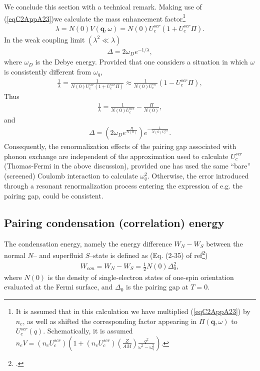 We conclude this section with a technical remark. Making use of (\ref{eqC2AppA23})we calculate the mass enhancement factor\footnote{It is assumed that in this calculation we have multiplied (\ref{eqC2AppA23}) by $n_e$, as well as shifted the corresponding factor appearing in $\Pi(\mathbf q, \omega)$ to $U_c^{scr}(q)$. Schematically, it is assumed $n_eV=(n_e U_c^{scr})\left(1+(n_e U_c^{scr})\left(\frac{Z}{AM}\right)\frac{q^2}{\omega^2-\omega_q^2}\right)$.}
\begin{align}\label{eqC2AppA25}
\lambda=N(0)V(\mathbf q,\omega)=N(0)U^{scr}_c\left(1+U^{scr}_c\Pi\right).
\end{align}
In the weak coupling limit $(\lambda^2\ll\lambda)$
\begin{align}\label{eqC2AppA26}
\Delta=2\omega_De^{-1/\lambda},
\end{align}
where $\omega_D$ is the Debye energy.
  Provided that one considers  a situation in which $\omega$ is consistently different from $\omega_q$,
\begin{align}\label{eqC2AppA28}
\frac{1}{\lambda}=\frac{1}{N(0)U^{scr}_c\left(1+U^{scr}_c\Pi\right)}\approx\frac{1}{N(0)U^{scr}_c}\left(1-U^{scr}_c\Pi\right),
\end{align}
Thus
\begin{align}\label{eqC2AppA29}
\frac{1}{\lambda}=\frac{1}{N(0)U^{scr}_c}-\frac{\Pi}{N(0)},
\end{align}
and
\begin{align}\label{eqC2AppA30}
\Delta=\left(2\omega_De^{\frac{\Pi}{N(0)}}\right)e^{-\frac{1}{N(0)U^{scr}_c}}.
\end{align}
 Consequently, the renormalization effects of the pairing gap associated with phonon exchange are independent of the approximation used to calculate $U^{scr}_c$ (Thomas-Fermi in the above discussion), provided one has used the same ``bare'' (screened) Coulomb interaction to calculate $\omega^2_q$.   Otherwise, the error introduced through a resonant renormalization process entering the expression of e.g. the pairing gap, could be consistent.
\subsection{Pairing condensation (correlation) energy}
The condensation energy, namely the energy difference $W_N-W_S$ between the normal $N$-- and superfluid $S$--state is defined as (Eq. (2-35) of ref\footnote{\label{foot1}\cite{Schrieffer:64}.})
\begin{align}\label{eqC3AppA1}
W_{con}=W_N-W_S=\frac{1}{2}N(0)\Delta_0^2,
\end{align}
where $N(0)$ is the density of single-electron states of one-spin orientation evaluated at the Fermi surface, and $\Delta_0$ is the pairing gap at $T=0$.



